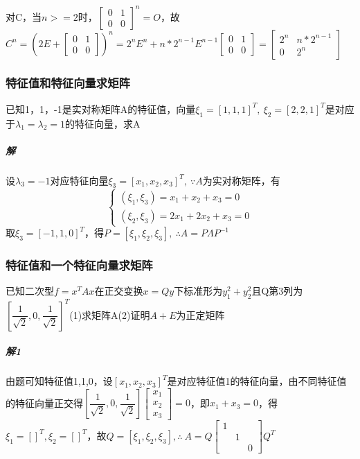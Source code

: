 对C，当\(n >= 2\)时，\(\begin{bmatrix}
    0 & 1 \\ 
    0 & 0
\end{bmatrix}^n = O\)，故\(C^n = (2E + \begin{bmatrix}
    0 & 1 \\ 
    0 & 0
\end{bmatrix})^n = 2^nE^n + n * 2^{n - 1}E^{n - 1}\begin{bmatrix}
    0 & 1 \\ 
    0 & 0
\end{bmatrix} = \begin{bmatrix}
    2^n & n * 2^{n - 1} \\ 
    0 & 2^n
\end{bmatrix}\)

\subsubsection{特征值和特征向量求矩阵}
已知1，1，-1是实对称矩阵A的特征值，向量\(\xi_1 = [1, 1, 1]^T,\ \xi_2 = [2, 2, 1]^T\)是对应于\(\lambda_1 = \lambda_2 = 1\)的特征向量，求A
\subparagraph{解}
设\(\lambda_3 = -1\)对应特征向量\(\xi_3 = [x_1, x_2, x_3]^T,\ \because A\)为实对称矩阵，有\[\begin{cases}
    (\xi_1, \xi_3) = x_1 + x_2 + x_3 = 0 \\ 
    (\xi_2, \xi_3) = 2x_1 + 2x_2 + x_3 = 0
\end{cases}\]
取\(\xi_3 = [-1, 1, 0]^T\)，得\(P = [\xi_1, \xi_2, \xi_3],\ \therefore A = P\Lambda P^{-1}\)

\subsubsection{特征值和一个特征向量求矩阵}
已知二次型\(f = x^TAx\)在正交变换\(x = Qy\)下标准形为\(y_1^2 + y_2^2\)且Q第3列为\([\dfrac{1}{\sqrt{2}}, 0, \dfrac{1}{\sqrt{2}}]^T\)(1)求矩阵A(2)证明\(A + E\)为正定矩阵

\subparagraph{解1}
由题可知特征值1,1,0，设\([x_1, x_2, x_3]^T\)是对应特征值1的特征向量，由不同特征值的特征向量正交得\([\dfrac{1}{\sqrt{2}}, 0, \dfrac{1}{\sqrt{2}}]\begin{bmatrix}
    x_1 \\ 
    x_2 \\ 
    x_3
\end{bmatrix} = 0\)，即\(x_1 + x_3 = 0\)，得\(\xi_1 = []^T, \xi_2 = []^T\)，故\(Q = [\xi_1, \xi_2, \xi_3], \therefore\ A = Q\begin{bmatrix}
    1 \\ 
    & 1 \\ 
    & & 0
\end{bmatrix}Q^T\)

